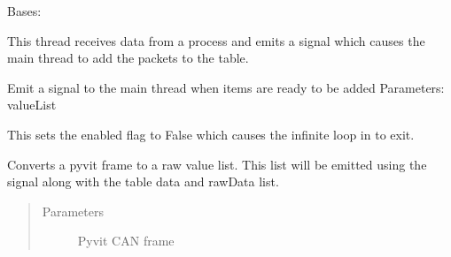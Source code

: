 \documentclass[letterpaper,10pt,english]{sphinxmanual}
\begin{document}
\begin{fulllineitems}
\label{\detokenize{src:src.ItemAdderThread.ItemAdderThread}}
Bases: 

This thread receives data from a process and
emits a signal which causes the main thread to add the packets
to the table.

\begin{fulllineitems}
\label{\detokenize{src:src.ItemAdderThread.ItemAdderThread.__init__}}
\end{fulllineitems}


\begin{fulllineitems}
\label{\detokenize{src:src.ItemAdderThread.ItemAdderThread.appendRow}}
Emit a signal to the main thread when items are ready to be added
Parameters: valueList

\end{fulllineitems}


\begin{fulllineitems}
\label{\detokenize{src:src.ItemAdderThread.ItemAdderThread.disable}}
This sets the enabled flag to False which causes the infinite loop in {\hyperref[\detokenize{src:src.ItemAdderThread.ItemAdderThread.run}]{}} to exit.

\end{fulllineitems}


\begin{fulllineitems}
\label{\detokenize{src:src.ItemAdderThread.ItemAdderThread.frameToRow}}
Converts a pyvit frame to a raw value list. This list will be emitted using the signal
 along with the table data and rawData list.
\begin{quote}\begin{description}
\item[{Parameters}] \leavevmode
{} \textendash{} Pyvit CAN frame


\end{description}
\end{quote}
\end{fulllineitems}
\end{fulllineitems}
\end{document}
